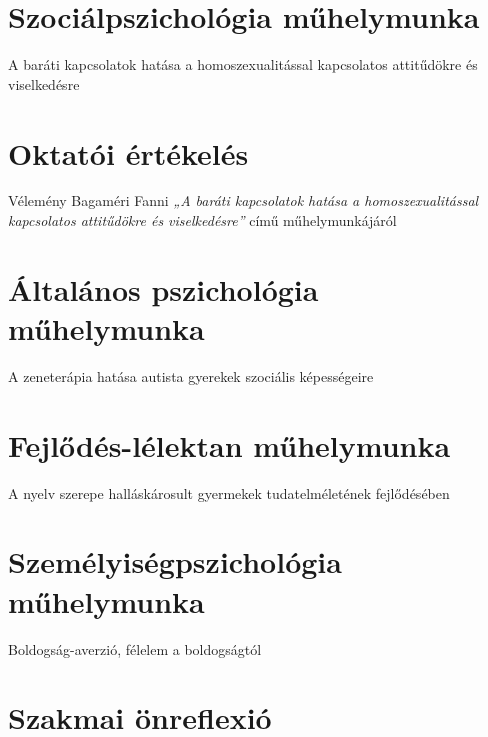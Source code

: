 \documentclass[12pt]{article}
\begin{document}




\pagebreak
\setcounter{tocdepth}{2}
\tableofcontents
\listoftables
\pagebreak
\justify
\newrefsection
\part{Szociálpszichológia műhelymunka}
\begin{large}
	\Large A baráti kapcsolatok hatása a  homoszexualitással kapcsolatos attitűdökre és viselkedésre
\end{large}

\printbibliography[title={Hivatkoz\'asok}]
\pagebreak
\part{Oktatói értékelés}
\begin{large}
	\large Vélemény Bagaméri Fanni \textit{„A baráti kapcsolatok hatása a homoszexualitással kapcsolatos attitűdökre és viselkedésre”} című műhelymunkájáról
\end{large}

\newrefsection
\pagebreak
\part{Általános pszichológia műhelymunka}
\begin{large}
	\Large A zeneterápia hatása autista gyerekek szociális képességeire
\end{large}

\printbibliography[title={Hivatkoz\'asok}]
\newrefsection
\pagebreak
\part{Fejlődés-lélektan műhelymunka}
\begin{large}
	\Large A nyelv szerepe halláskárosult gyermekek tudatelméletének fejlődésében
\end{large}

\printbibliography[title={Hivatkoz\'asok}]
\newrefsection
\pagebreak
\part{Személyiségpszichológia műhelymunka}
\begin{large}
	\Large Boldogság-averzió, félelem a boldogságtól
\end{large}

\printbibliography[title={Hivatkoz\'asok}]
\newrefsection
\pagebreak
\part{Szakmai önreflexió}

\pagebreak



\footnotesize
\end{document}

